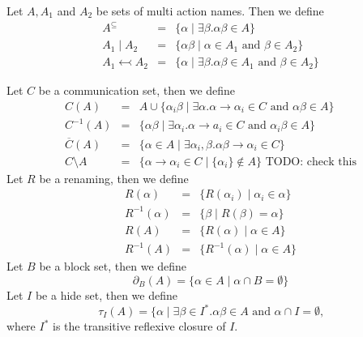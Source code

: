 \documentclass{article}
\begin{document}
Let $A,A_{1}$ and $A_{2}$ be sets of multi action names. Then we define%
\[
\begin{array}{lll}
A^{\subseteq } & = & \{\alpha \mid \exists \beta .\alpha \beta \in A\} \\ 
A_{1}\mid A_{2} & = & \{\alpha \beta \mid \alpha \in A_{1}\text{ and }\beta
\in A_{2}\} \\ 
A_{1}\leftarrowtail A_{2} & = & \{\alpha \mid \exists \beta .\alpha \beta
\in A_{1}\text{ and }\beta \in A_{2}\}%
\end{array}%
\]

Let $C$ be a communication set, then we define%
\begin{eqnarray*}
C(A) &=&A\cup \{\alpha _{i}\beta \mid \exists \alpha .\alpha \rightarrow
\alpha _{i}\in C\text{ and }\alpha \beta \in A\} \\
C^{-1}(A) &=&\{\alpha \beta \mid \exists \alpha _{i}.\alpha \rightarrow
a_{i}\in C\text{ and }\alpha _{i}\beta \in A\} \\
\overline{C}(A) &=&\{\alpha \in A\mid \exists \alpha _{i},\beta .\alpha
\beta \rightarrow \alpha _{i}\in C\} \\
C\setminus A &=&\{\alpha \rightarrow \alpha _{i}\in C\mid \{\alpha
_{i}\}\notin A\}\text{ TODO: check this}
\end{eqnarray*}%
Let $R$ be a renaming, then we define%
\begin{eqnarray*}
R(\alpha ) &=&\{R(\alpha _{i})\mid \alpha _{i}\in \alpha \} \\
R^{-1}(\alpha ) &=&\{\beta \mid R(\beta )=\alpha \} \\
R(A) &=&\{R(\alpha )\mid \alpha \in A\} \\
R^{-1}(A) &=&\{R^{-1}(\alpha )\mid \alpha \in A\}
\end{eqnarray*}%
Let $B$ be a block set, then we define%
\[
\partial _{B}(A)=\{\alpha \in A\mid \alpha \cap B=\emptyset \} 
\]%
Let $I$ be a hide set, then we define%
\[
\tau _{I}(A)=\{\alpha \mid \exists \beta \in I^{\ast }.\alpha \beta \in A%
\text{ and }\alpha \cap I=\emptyset \text{,} 
\]%
where $I^{\ast }$ is the transitive reflexive closure of $I$.\newpage
\end{document}
